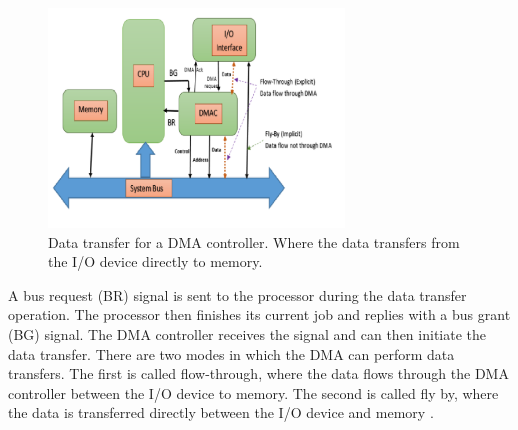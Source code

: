 \begin{figure}[h]
    \centering
    \includegraphics[width=0.70\textwidth]{graphics/DMA.png}
    \caption{Data transfer for a DMA controller. Where the data transfers from the I/O device directly to memory. \cite{ahmed_design_2019}}
    \label{fig:DMAcontroller}
\end{figure}

A bus request (BR) signal is sent to the processor during the data transfer operation.
The processor then finishes its current job and replies with a bus grant (BG) signal.
The DMA controller receives the signal and can then initiate the data transfer.
There are two modes in which the DMA can perform data transfers.
The first is called flow-through, where the data flows through the DMA controller between the I/O device to memory.
The second is called fly by, where the data is transferred directly between the I/O device and memory \cite{ahmed_design_2019}.


